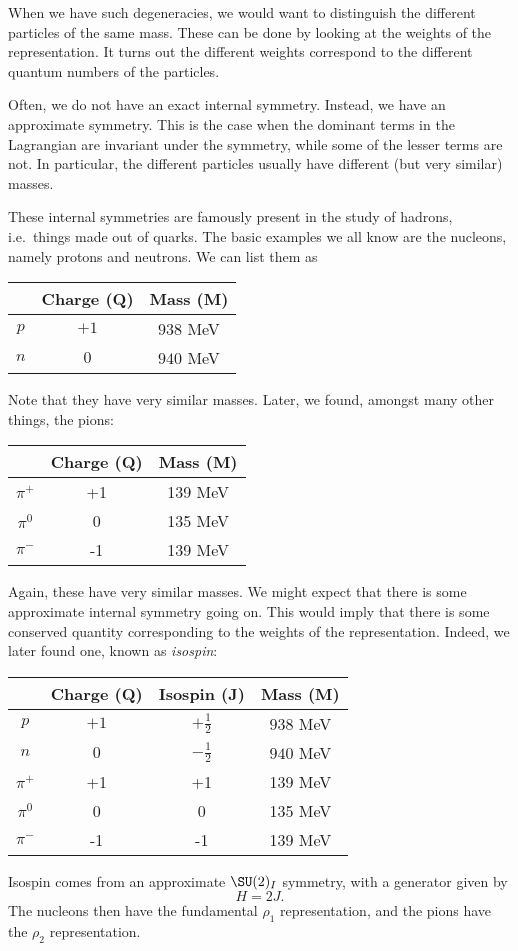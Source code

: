 \documentclass[a4paper]{article}
\begin{document}
When we have such degeneracies, we would want to distinguish the different particles of the same mass. These can be done by looking at the weights of the representation. It turns out the different weights correspond to the different quantum numbers of the particles.

Often, we do not have an exact internal symmetry. Instead, we have an approximate symmetry. This is the case when the dominant terms in the Lagrangian are invariant under the symmetry, while some of the lesser terms are not. In particular, the different particles usually have different (but very similar) masses.

These internal symmetries are famously present in the study of hadrons, i.e.\ things made out of quarks. The basic examples we all know are the nucleons, namely protons and neutrons. We can list them as
\begin{center}
  \begin{tabular}{ccc}
    \toprule
    & Charge (Q) & Mass (M)\\
    \midrule
    $p$ & $+1$ & $938$ MeV\\
    $n$ & $0$ & $940$ MeV\\
    \bottomrule
  \end{tabular}
\end{center}
Note that they have very similar masses. Later, we found, amongst many other things, the pions:
\begin{center}
  \begin{tabular}{ccc}
    \toprule
    & Charge (Q) & Mass (M)\\
    \midrule
    $\pi^+$ & +1 & 139 MeV\\
    $\pi^0$ & 0 & 135 MeV\\
    $\pi^-$ & -1 & 139 MeV\\
    \bottomrule
  \end{tabular}
\end{center}
Again, these have very similar masses. We might expect that there is some approximate internal symmetry going on. This would imply that there is some conserved quantity corresponding to the weights of the representation. Indeed, we later found one, known as \emph{isospin}:
\begin{center}
  \begin{tabular}{cccc}
    \toprule
    & Charge (Q) & Isospin (J) & Mass (M)\\
    \midrule
    $p$ & $+1$ & $+\frac{1}{2}$ & $938$ MeV\\
    $n$ & $0$ & $-\frac{1}{2}$ & $940$ MeV\\
    $\pi^+$ & +1 & +1 & 139 MeV\\
    $\pi^0$ & 0 & 0 & 135 MeV\\
    $\pi^-$ & -1 & -1 & 139 MeV\\
    \bottomrule %
  \end{tabular}
\end{center}
Isospin comes from an approximate $\SU(2)_I$ symmetry, with a generator given by
\[
  H = 2J.
\]
The nucleons then have the fundamental $\rho_1$ representation, and the pions have the $\rho_2$ representation.
\end{document}
